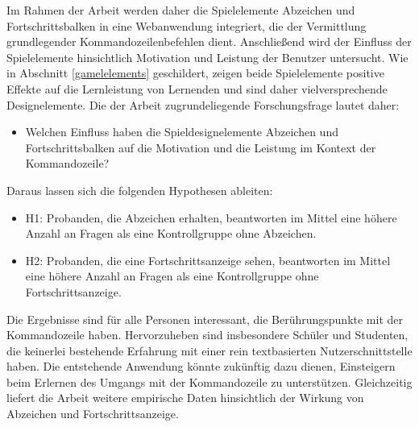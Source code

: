 Im Rahmen der Arbeit werden daher die Spielelemente Abzeichen und Fortschrittsbalken in eine Webanwendung integriert, die der Vermittlung grundlegender Kommandozeilenbefehlen dient. Anschließend wird der Einfluss der Spielelemente hinsichtlich Motivation und Leistung der Benutzer untersucht. Wie in Abschnitt \ref{gamelelements} geschildert, zeigen beide Spielelemente positive Effekte auf die Lernleistung von Lernenden und sind daher vielversprechende Designelemente. Die der Arbeit zugrundeliegende Forschungsfrage lautet daher:

\begin{itemize}
    \item Welchen Einfluss haben die Spieldesignelemente Abzeichen und Fortschrittsbalken auf die Motivation und die Leistung im Kontext der Kommandozeile?
\end{itemize}

Daraus lassen sich die folgenden Hypothesen ableiten:

\begin{itemize}
\item H1: Probanden, die Abzeichen erhalten, beantworten im Mittel eine höhere Anzahl an Fragen als eine Kontrollgruppe ohne Abzeichen.
\item H2: Probanden, die eine Fortschrittsanzeige sehen, beantworten im Mittel eine höhere Anzahl an Fragen als eine Kontrollgruppe ohne Fortschrittsanzeige.
\end{itemize}

Die Ergebnisse sind für alle Personen interessant, die Berührungspunkte mit der Kommandozeile haben.
Hervorzuheben sind insbesondere Schüler und Studenten, die keinerlei bestehende Erfahrung mit einer rein textbasierten Nutzerschnittstelle haben. Die entstehende Anwendung könnte zukünftig dazu dienen, Einsteigern beim Erlernen des Umgangs mit der Kommandozeile zu unterstützen. Gleichzeitig liefert die Arbeit weitere empirische Daten hinsichtlich der Wirkung von Abzeichen und Fortschrittsanzeige.